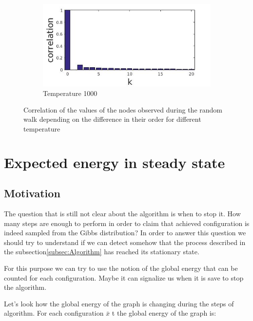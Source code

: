 \documentclass[12pt]{report}
\begin{document}
\begin{figure}[t]
\begin{subfigure}[b]{0.4\textwidth}
    \end{subfigure}   
    ~ 
    \begin{subfigure}[b]{0.4\textwidth}
        \includegraphics[width=\textwidth]{rggT1000corr}
        \caption{Temperature 1000}

    \end{subfigure}
    
    \caption{Correlation of the values of the nodes observed during the random walk depending on the difference in their order for different temperature}
    \label{fig:testGibbsCorr}
\end{figure}

\section{Expected energy in steady state}

\subsection{Motivation}

The question that is still not clear about the algorithm is when to stop it. How many steps are enough to perform in order to claim that achieved configuration is indeed sampled from the Gibbs distribution?
In order to answer this question we should try to understand if we can detect somehow that the process described in the subsection\ref{subsec:Algorithm} has reached its stationary state.

For this purpose we can try to use the notion of the global energy that can be counted for each configuration. Maybe it can signalize us when it is save to stop the algorithm.

 
Let's look how the global energy of the graph is changing during the steps of algorithm. For each configuration $\bar{x}$ t the global energy of the graph is:
\end{document}
